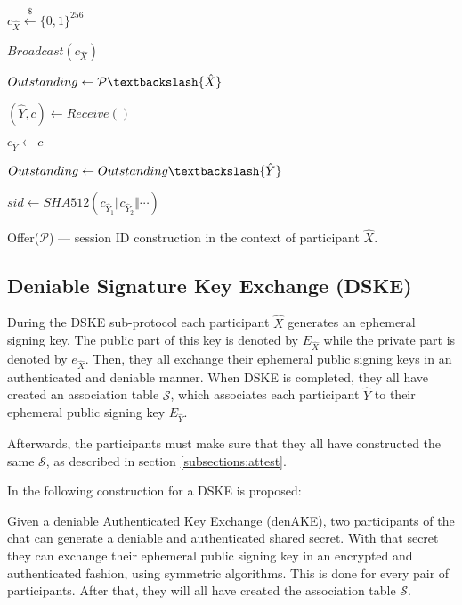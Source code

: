 \begin{algorithm}[t]
  \Begin
  {
	$c_{\hat{X}} \xleftarrow{\$} \{0,1\}^{256}$
	
	$Broadcast(c_{\hat{X}})$
	
	$Outstanding \leftarrow \mathcal{P} \textbackslash \{\hat{X}\}$

    {    
      $(\hat{Y}, c) \leftarrow Receive()$
      
      {      
        $c_{\hat{Y}} \leftarrow c$
      
        $Outstanding \leftarrow Outstanding \textbackslash \{\hat{Y}\}$
      }
    }
   
    $sid \leftarrow SHA512(c_{\hat{Y}_1} \Vert c_{\hat{Y}_2} \Vert \cdots)$


  }
  \caption{Offer($\mathcal{P}$) --- session ID construction in the context of participant $\hat{X}$.}
  \label{algo:offer}
\end{algorithm}


\subsection{Deniable Signature Key Exchange (DSKE)}
\label{subsections:DSKE}
During the DSKE sub-protocol each participant $\hat{X}$ generates an ephemeral signing key. The public part of this key is denoted by $E_{\hat{X}}$ while the private part is denoted by $e_{\hat{X}}$. Then, they all exchange their ephemeral public signing keys in an authenticated and deniable manner. When DSKE is completed, they all have created an association table $\mathcal{S}$, which associates each participant $\hat{Y}$ to their ephemeral public signing key $E_{\hat{Y}}$.

Afterwards, the participants must make sure that they all have constructed the same $\mathcal{S}$, as described in section \ref{subsections:attest}.

In \cite{mpotr} the following construction for a DSKE is proposed:

Given a deniable Authenticated Key Exchange (denAKE), two participants of the chat can generate a deniable and authenticated shared secret. With that secret they can exchange their ephemeral public signing key in an encrypted and authenticated fashion, using symmetric algorithms. This is done for every pair of participants. After that, they will all have created the association table $\mathcal{S}$.


